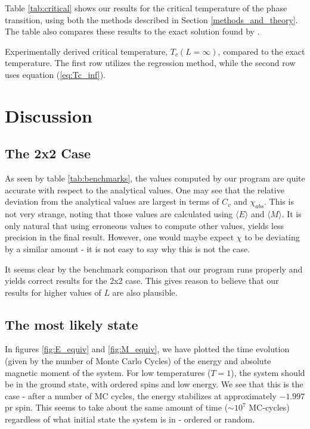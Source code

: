 \documentclass[12pt,english,a4paper]{article}
\begin{document}
\noindent Table \ref{tab:critical} shows our results for the critical temperature of the phase transition, using both the methods described in Section \ref{methods_and_theory}. The table also compares these results to the exact solution found by \cite{LarsOns}.

\begin{table}[H]
    \centerline{}
    \caption{Experimentally derived critical temperature, $T_c(L=\infty)$, compared to the exact temperature. The first row utilizes the regression method, while the second row uses equation (\ref{eq:Tc_inf}).}
    \label{tab:critical}
\end{table}

\section{Discussion} \label{discussion}

\subsection{The 2x2 Case}
As seen by table \ref{tab:benchmarks}, the values computed by our program are quite accurate with respect to the analytical values. One may see that the relative deviation from the analytical values are largest in terms of $ C_v $ and $\chi _{abs}$. This is not very strange, noting that those values are calculated using $\langle E \rangle$ and $\langle M \rangle$. It is only natural that using erroneous values to compute other values, yields less precision in the final result. However, one would maybe expect $\chi$ to be deviating by a similar amount - it is not easy to say why this is not the case. 

It seems clear by the benchmark comparison that our program runs properly and yields correct results for the 2x2 case. This gives reason to believe that our results for higher values of $L$ are also plausible. 

\subsection{The most likely state}
In figures \ref{fig:E_equiv} and \ref{fig:M_equiv}, we have plotted the time evolution (given by the number of Monte Carlo Cycles) of the energy and absolute magnetic moment of the system. For low temperatures ($T = 1$), the system should be in the ground state, with ordered spins and low energy. We see that this is the case - after a number of MC cycles, the energy stabilizes at approximately $-1.997$ pr spin. This seems to take about the same amount of time ($\sim 10^7$ MC-cycles) regardless of what initial state the system is in - ordered or random. 
\end{document}
